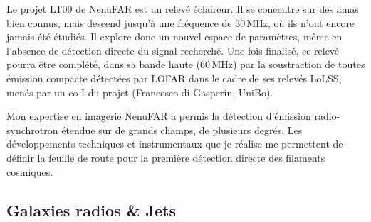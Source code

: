 \pg
Le projet LT09 de NenuFAR est un relev\'e \'eclaireur. Il se concentre sur des amas bien connus, mais descend jusqu'\`a une fr\'equence de 30\,MHz, o\`u ils n'ont encore jamais \'et\'e \'etudi\'es. Il explore donc un nouvel espace de param\`etres, m\^eme en l'absence de d\'etection directe du signal recherch\'e. Une fois finalis\'e, ce relev\'e pourra \^etre compl\'et\'e, dans sa bande haute (60\,MHz) par la soustraction de toutes \'emission compacte d\'etect\'ees par LOFAR dans le cadre de ses relev\'es LoLSS, men\'es par un co-I du projet (Francesco di Gasperin, UniBo).%

\begin{tcolorbox}[colback=green!10, colframe=green!50!black, arc=3mm, boxrule=1pt]
	Mon expertise en imagerie NenuFAR a permis la d\'etection d'\'emission radio-synchrotron \'etendue sur de grands champs, de plusieurs degr\'es. Les développements techniques et instrumentaux que je réalise me permettent de définir la feuille de route pour la première détection directe des filaments cosmiques.
\end{tcolorbox}





\subsection{Galaxies radios \& Jets}

